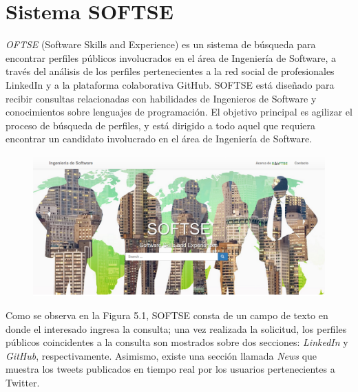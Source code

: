 
 


\chapter{Sistema SOFTSE}
\label{chap:softse}

\textit{OFTSE} (Software Skills and Experience) es un sistema de búsqueda para encontrar perfiles públicos involucrados en el área de Ingeniería de Software, a través del análisis de los perfiles pertenecientes a la red social de profesionales LinkedIn y a la plataforma colaborativa GitHub. SOFTSE está diseñado para recibir consultas relacionadas con habilidades de Ingenieros de Software y conocimientos sobre lenguajes de programación. El objetivo principal es agilizar el proceso de búsqueda de perfiles, y está dirigido a todo aquel que requiera encontrar un candidato involucrado en el área de Ingeniería de Software.

\begin{figure}[H]
	\centering
	\includegraphics[height=0.2\textheight]{fig01/softse_1.png}
	\label{fig:RHP02}
\end{figure}

Como se observa en la Figura 5.1, SOFTSE consta de un campo de texto en donde el interesado ingresa la consulta; una vez realizada la solicitud, los perfiles públicos coincidentes a la consulta son mostrados sobre dos secciones: \textit{LinkedIn} y \textit{GitHub}, respectivamente. Asimismo, existe una sección llamada \textit{News} que muestra los tweets publicados en tiempo real por los usuarios pertenecientes a Twitter.

